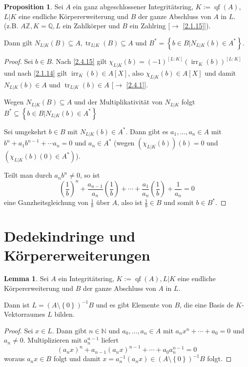 \documentclass[
twoside=semi,
fontsize=12,
DIV=12, 
cleardoublepage=current,
leqno,
headings=optiontoheadandtoc, 
toc=idx
]{scrbook}
\newcommand{\N}{\mathbb{N}}
\newcommand{\Z}{\mathbb{Z}}
\newcommand{\Q}{\mathbb{Q}}
\newcommand{\brac}[1]{\left( #1 \right)}
\newcommand{\set}[1]{\left\{ #1 \right\}}
\DeclareMathOperator{\qf}{qf}
\DeclareMathOperator{\irr}{irr}
\DeclareMathOperator{\tr}{tr}
\theoremstyle{definition}
\newtheorem{lemma}[definition]{Lemma}
\newtheorem{proposition}[definition]{Proposition}
\begin{document}
 	\begin{proposition}\label{2.4.25}
 		Sei $A$ ein ganz abgeschlossener Integrit\"atsring, $K:=\qf(A)$, $L|K$ eine endliche K\"orpererweiterung und $B$ der ganze Abschluss von $A$ in $L$.
 		(z.B. $A \Z, K = \Q, L$ ein Zahlk\"orper und $B$ ein Zahlring [$\to$ \ref{2.1.15}]).
 		
 		Dann gilt $N_{L|K}(B) \subseteq A, \tr_{L|K}(B) \subseteq A$ und $B^* = \set{b \in B| N_{L|K}(b) \in A^*}$.
 		
 		\begin{proof}
 			Sei $b \in B$. Nach \ref{2.4.15} gilt $\chi_{L|K}(b) = (-1)^{[L:K]}(\irr_K(b))^{[L:K]}$ und nach \ref{2.1.14} gilt $\irr_K(b) \in A[X]$, also $\chi_{L|K}(b) \in A[X]$ und damit
 			$N_{L|K}(b) \in A$ und $\tr_{L|K}(b) \in A$ [$\to$ \ref{2.4.1}].
 			
 			Wegen $N_{L|K}(B) \subseteq A$ und der Multiplikativit\"at von $N_{L|K}$ folgt $B^* \subseteq \set{b \in B| N_{L|K}(b) \in A^*}$
 			
 			Sei umgekehrt $b \in B$ mit $N_{L|K}(b) \in A^*$. Dann gibt es $a_1, \dots, a_n \in A$ mit $b^n + a_1b^{n-1} + \cdots a_n = 0$ und
 			$a_n \in A^*$ (wegen $(\chi_{L|K}(b))(b) = 0$ und $(\chi_{L|K}(b)(0) \in A^*)$).
 			
 			Teilt man durch $a_nb^n \neq 0$, so ist 
 				\[\brac{\frac{1}{b}}^n + \frac{a_{n-1}}{a_n}\brac{\frac{1}{b}} + \cdots + \frac{a_1}{a_n}\brac{\frac{1}{b}} + \frac{1}{a_n} = 0\]
 			eine Ganzheitsgleichung von $\frac{1}{b}$ \"uber $A$, also ist $\frac{1}{b} \in B$ und somit $b \in B^*$. 
 		\end{proof}
 	\end{proposition}
 
 	\newpage
 	\section{Dedekindringe und K\"orpererweiterungen}
 	\begin{lemma}\label{2.5.1}
 		Sei $A$ ein Integrit\"atsring, $K:= \qf(A), L|K$ eine endliche K\"orpererweiterung und $B$ der ganze Abschluss von $A$ in $L$.
 		
 		Dann ist $L = \brac{A\setminus \set{0}}^{-1} B$ und es gibt Elemente von $B$, die eine Basis de $K$-Vektorraumes $L$ bilden.
 		
 		\begin{proof}
 			Sei $x \in L$. Dann gibt $n \in \N$ und $a_0, \dots, a_n \in A$ mit $a_nx^n + \cdots + a_0 = 0$ und $a_n \neq 0$. Multiplizieren mit $a_n^{n-1}$ liefert
 				\[(a_nx)^n + a_{n-1}(a_nx)^{n-1} + \cdots + a_0a_n^{n-1} = 0\]
 			woraus $a_nx \in B$ folgt und damit $x = a_n^{-1}(a_nx) \in \brac{A \setminus \set{0}}^{-1}B$ folgt.
 		\end{proof} 
 	\end{lemma}
 	
\end{document}

